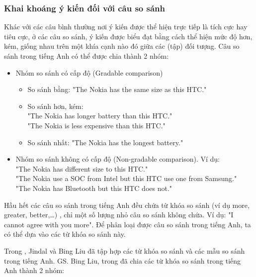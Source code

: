 \documentclass[12pt]{extarticle}
\begin{document}
			\subsubsection*{Khai khoáng ý kiến đối với câu so sánh}
				\label{comparative_section}
				\par Khác với các câu bình thường nơi ý kiến được thể hiện trực tiếp là tích cực hay tiêu cực, ở các câu so sánh, ý kiến được biểu đạt bằng cách thể hiện mức độ hơn, kém, giống nhau trên một khía cạnh nào đó giữa các (tập) đối tượng. Câu so sánh trong tiếng Anh có thể được chia thành 2 nhóm:
				\begin{itemize}
					\item{Nhóm so sánh có cấp độ (Gradable comparison)}	
					\begin{itemize}
						\item{So sánh bằng: "The Nokia has the same size as this HTC."}					
						\item{So sánh hơn, kém: \\"The Nokia has longer battery than this HTC."\\"The Nokia is less expensive than this HTC."}
						\item{So sánh nhất: "The Nokia has the longest battery."}
					\end{itemize}				
					\item{Nhóm so sánh không có cấp độ (Non-gradable comparison). Ví dụ:
						\\"The Nokia has different size to this HTC."
						\\"The Nokia use a SOC from Intel but this HTC use one from Samsung."
						\\"The Nokia has Bluetooth but this HTC does not."}					
				\end{itemize}
				\par Hầu hết các câu so sánh trong tiếng Anh đều chứa từ khóa so sánh (ví dụ more, greater, better,…) \cite{sentiment}, chỉ một số lượng nhỏ câu so sánh không chứa. Ví dụ: "I cannot agree with you more". Để phân loại được câu so sánh trong tiếng Anh, ta có thể dựa vào các từ khóa so sánh này.
				\par Trong \cite{comparative1}, Jindal và Bing Liu đã tập hợp các từ khóa so sánh và các mẫu so sánh trong tiếng Anh. GS. Bing Liu, trong \cite{sentiment} đã chia các từ khóa so sánh trong tiếng Anh thành 2 nhóm:
\end{document}
